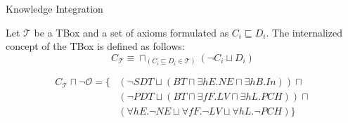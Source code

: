 \documentclass{beamer}
\begin{document}
\begin{frame}{Knowledge Integration}
\begin{defn}
Let $\mathcal{T}$ be a TBox and a set of axioms formulated as $C_i \sqsubseteq D_i$. The internalized concept of the TBox is defined as follows:
$$C_\mathcal{T} \equiv \sqcap_{(C_i \sqsubseteq D_i\in \mathcal{T})} (\neg C_i \sqcup D_i) $$
\label{def:ic}
\end{defn}
 \begin{align*}
 C_\mathcal{T}\sqcap  \neg\mathcal{O}= \{ &(\neg SDT \sqcup (BT \sqcap \exists hE. NE \sqcap \exists hB. In)) \sqcap \\
 &(\neg PDT \sqcup ( BT \sqcap \exists fF. LV \sqcap \exists hL. PCH)) \sqcap \\
 &(\forall hE. \neg NE \sqcup \forall fF. \neg LV \sqcup \forall hL.\neg PCH )\}
\end{align*}
\end{frame}








\end{document}
